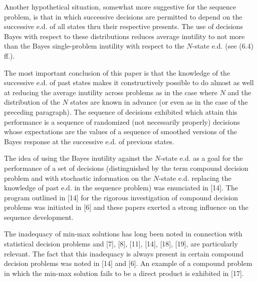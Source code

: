 \documentclass[11pt]{article}
\numberwithin{equation}{section}
\theoremstyle{boldStyle}
\begin{document}
Another hypothetical situation, somewhat more suggestive for the sequence problem, is that in which successive decisions are permitted to depend on the successive e.d. 
of all states thru their respective presents. The use of decisions Bayes with respect to these distributions reduces average inutility to not more than the 
Bayes single-problem inutility with respect to the \( N \)-state e.d. (see (6.4) ff.).

\medbreak

The most important conclusion of this paper is that the knowledge of the successive e.d. of past states makes it constructively possible 
to do almost as well at reducing the average inutility across problems as in the case where \( N \) and the distribution of the \( N \) 
states are known in advance (or even as in the case of the preceding paragraph). 
The sequence of decisions exhibited which attain this performance is a sequence of randomized (not necessarily properly) decisions 
whose expectations are the values of a sequence of smoothed versions of the Bayes response at the successive e.d. of previous states.

\medbreak

The idea of using the Bayes inutility against the \( N \)-state e.d. as a goal for the performance of a set of decisions 
(distinguished by the term compound decision problem and with stochastic information on the \( N \)-state e.d. replacing the knowledge 
of past e.d. in the sequence problem) was enunciated in [14]. 
The program outlined in [14] for the rigorous investigation of compound decision problems was initiated in [6] and 
these papers exerted a strong influence on the sequence development.

\medbreak

The inadequacy of min-max solutions has long been noted in connection with statistical decision problems and [7], [8], [11], [14], [18], [19], are particularly relevant. The fact that this inadequacy is always present in certain compound decision problems was noted in [14] and [6]. An example of a compound problem in which the min-max solution fails to be a direct product is exhibited in [17].



\end{document}
